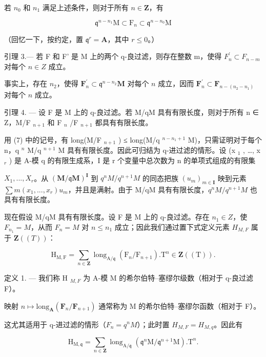 若 \(n_{0}\) 和 \(n_{1}\) 满足上述条件，则对于所有 \(n\in\mathbf{Z}\)，有

\[
\mathfrak {q} ^ {n - n _ {1}} \mathrm{M} \subset \mathrm{F} _ {n} \subset \mathfrak {q} ^ {n - n _ {0}} \mathrm{M}\tag{7}
\]

（回忆一下，按约定，置 \(\mathfrak{q}^r = \mathbf{A}\)，其中 \(r\leqslant 0\)。）

引理 3.--- 若 F 和 F' 是 M 上的两个 q-良过滤，则存在整数 m，使得 \(F_{n}^{\prime} \subset F_{n-m}\) 对每个 \(n \in Z\) 成立。

事实上，存在 \(n_{2}\)，使得 \(\mathbf{F}_{n}^{\prime}\subset\mathfrak{q}^{n-n_{2}}\mathbf{M}\) 对每个 \(n\) 成立，因而 \(\mathbf{F}_{n}^{\prime}\subset\mathbf{F}_{n-(n_{2}-n_{1})}\) 对每个 \(n\) 成立。

引理 4. --- 设 F 是 M 上的 q-良过滤。若 M/qM 具有有限长度，则对于所有 n ∈ Z，M/F \(_{n+1}\) 和 F \(_{n}\) /F \(_{n+1}\) 都具有有限长度。

用 (7) 中的记号，有 long(M/F \(_{n+1}\) ) ≤ long(M/q \(^{n-n_1+1}\) M)，只需证明对于每个 n，q \(^{n}\) M/q \(^{n+1}\) M 具有有限长度。因此可归结为 q-进过滤的情形。设 (x \(_{1}\) , \ldots, x \(_{r}\) ) 是 A-模 q 的有限生成系，I 是 r 个变量中总次数为 n 的单项式组成的有限集

\(X_{1},...,X_{r}\)。从 \((\mathbf{M}/\mathfrak{q}\mathbf{M})^{\mathbf{I}}\) 到 \(q^{n}M/q^{n+1}M\) 的同态把族 \((u_{m})_{m\in\mathbf{I}}\) 映到元素 \(\sum m(x_{1},...,x_{r})u_{m}\)，并且是满射。由于 M/qM 具有有限长度，\(q^{n}M/q^{n+1}M\) 也具有有限长度。

现在假设 M/qM 具有有限长度。设 F 是 M 上的 q-良过滤。存在 \(n_{1} \in Z\)，使 \(F_{n_{1}} = M\)，从而 \(F_{n} = M\) 对 \(n \leqslant n_{1}\) 成立；因此我们通过置下式定义元素 \(H_{M,F}\) 属于 \(\mathbf{Z}((T))\)：

\[
\mathrm{H} _ {\mathrm{M}, \mathrm{F}} = \sum_ {n \in \mathbf {Z}} \operatorname{long} _ {\mathrm{A} / \mathfrak {q}} (\mathrm{F} _ {n} / \mathrm{F} _ {n + 1}). \mathrm{T} ^ {n} \in \mathbf {Z} ((\mathrm{T})) .\tag{8}
\]

定义 1. --- 我们称 H \(_{M,F}\) 为 A-模 M 的希尔伯特–塞缪尔级数（相对于 q-良过滤 F）。

映射 \(n\mapsto\text{long}_{\mathbf{A}}(\mathbf{F}_{n}/\mathbf{F}_{n+1})\) 通常称为 M 的希尔伯特–塞缪尔函数（相对于 F）。

这尤其适用于 q-进过滤的情形（\(F_{n} = q^{n}M\)）；此时置 \(H_{M,F} = H_{M,q}\)。因此有

\[
\mathrm{H} _ {\mathrm{M}, \mathfrak {q}} = \sum_ {n \in \mathbf {Z}} \operatorname{long} _ {\mathrm{A} / \mathfrak {q}} (\mathfrak {q} ^ {n} \mathrm{M} / \mathfrak {q} ^ {n + 1} \mathrm{M}). \mathrm{T} ^ {n}.\tag{9}
\]

